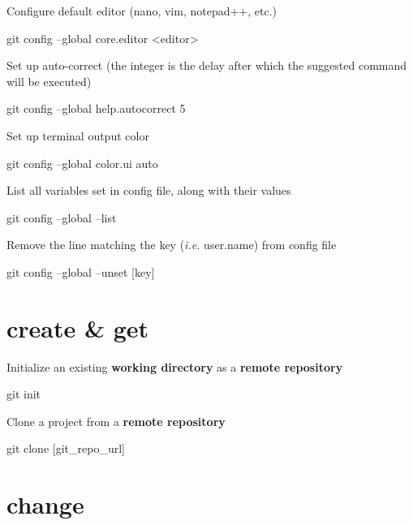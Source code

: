 \documentclass{refcard}
\begin{document}
Configure default editor (nano, vim, notepad++, etc.)
\begin{ttyenv}
git config --global core.editor <editor>
\end{ttyenv}

Set up auto-correct (the integer is the delay after which the suggested command will be executed)
\begin{ttyenv}
git config --global help.autocorrect 5
\end{ttyenv}

Set up terminal output color
\begin{ttyenv}
git config --global color.ui auto
\end{ttyenv}


List all variables set in config file, along with their values
\begin{ttyenv}
git config --global --list
\end{ttyenv}

Remove the line matching the key (\textit{i.e.} user.name) from config file
\begin{ttyenv}
git config --global --unset [key]
\end{ttyenv}

\section{create \& get}

Initialize an existing \textbf{working directory} as a \textbf{remote repository}
\begin{ttyenv}
git init
\end{ttyenv}

Clone a project from a \textbf{remote repository}
\begin{ttyenv}
git clone [git_repo_url]
\end{ttyenv}
 


\section{change}
\end{document}
